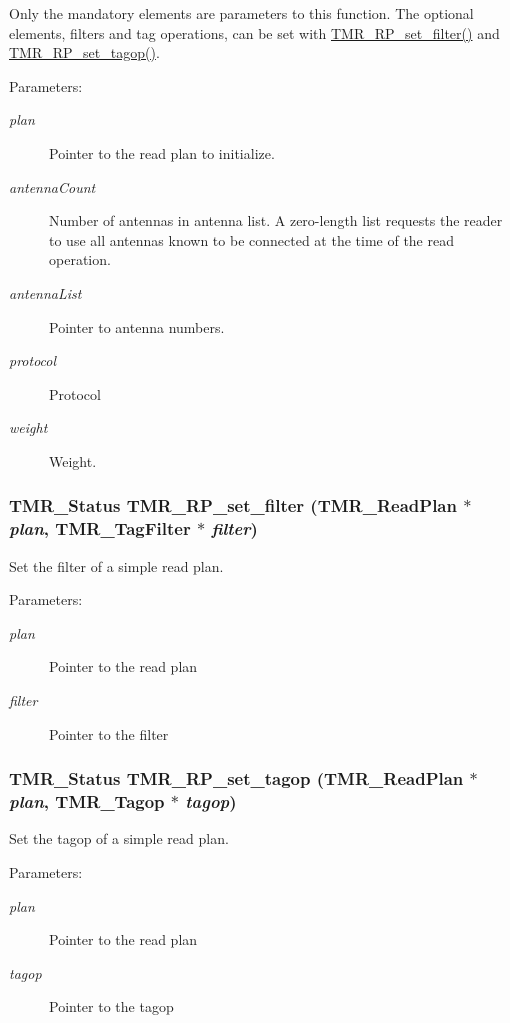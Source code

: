 Only the mandatory elements are parameters to this function. The optional elements, filters and tag operations, can be set with \hyperlink{group__readplan_g34719ef3c329be6b31af3bc2b4b3c234}{TMR\_\-RP\_\-set\_\-filter()} and \hyperlink{group__readplan_g5f6032baee5c6a042d2351ecb9ab3953}{TMR\_\-RP\_\-set\_\-tagop()}.

\begin{Desc}
\item[Parameters:]
\begin{description}
\item[{\em plan}]Pointer to the read plan to initialize. \item[{\em antennaCount}]Number of antennas in antenna list. A zero-length list requests the reader to use all antennas known to be connected at the time of the read operation. \item[{\em antennaList}]Pointer to antenna numbers. \item[{\em protocol}]Protocol \item[{\em weight}]Weight. \end{description}
\end{Desc}
\hypertarget{group__readplan_g34719ef3c329be6b31af3bc2b4b3c234}{
\subsubsection[{TMR\_\-RP\_\-set\_\-filter}]{\setlength{\rightskip}{0pt plus 5cm}TMR\_\-Status TMR\_\-RP\_\-set\_\-filter ({\bf TMR\_\-ReadPlan} $\ast$ {\em plan}, \/  {\bf TMR\_\-TagFilter} $\ast$ {\em filter})}}
\label{group__readplan_g34719ef3c329be6b31af3bc2b4b3c234}


Set the filter of a simple read plan.

\begin{Desc}
\item[Parameters:]
\begin{description}
\item[{\em plan}]Pointer to the read plan \item[{\em filter}]Pointer to the filter \end{description}
\end{Desc}
\hypertarget{group__readplan_g5f6032baee5c6a042d2351ecb9ab3953}{
\subsubsection[{TMR\_\-RP\_\-set\_\-tagop}]{\setlength{\rightskip}{0pt plus 5cm}TMR\_\-Status TMR\_\-RP\_\-set\_\-tagop ({\bf TMR\_\-ReadPlan} $\ast$ {\em plan}, \/  {\bf TMR\_\-Tagop} $\ast$ {\em tagop})}}
\label{group__readplan_g5f6032baee5c6a042d2351ecb9ab3953}


Set the tagop of a simple read plan.

\begin{Desc}
\item[Parameters:]
\begin{description}
\item[{\em plan}]Pointer to the read plan \item[{\em tagop}]Pointer to the tagop \end{description}
\end{Desc}

